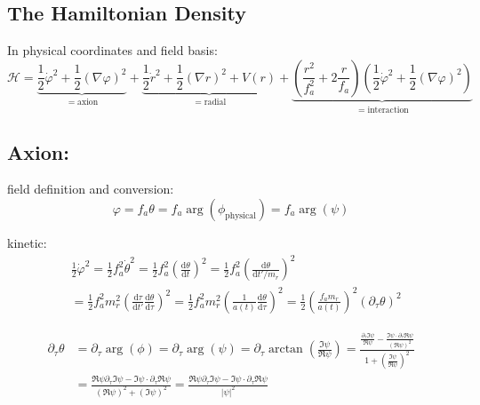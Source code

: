 \documentclass[a4paper]{article}
\begin{document}
\subsection{The Hamiltonian Density}
In physical coordinates and field basis:
\begin{equation}
    \mathcal{H} =
    \underbrace{\frac{1}{2} \dot{\varphi}^2 + \frac{1}{2} (\nabla \varphi)^2}_{= \mathrm{axion}} +
    \underbrace{\frac{1}{2} \dot{r}^2 + \frac{1}{2} (\nabla r)^2 + V(r)}_{= \mathrm{radial}} +
    \underbrace{\left( \frac{r^2}{f_a^2} + 2 \frac{r}{f_a} \right) \left( \frac{1}{2} \dot{\varphi}^2 + \frac{1}{2} (\nabla \varphi)^2 \right)}_{= \mathrm{interaction}}
\end{equation}

\subsection{Axion:}

field definition and conversion:
\begin{equation}
    \varphi = f_a \theta = f_a \arg(\phi_\mathrm{physical}) = f_a \arg(\psi)
\end{equation}

kinetic:
\begin{align}
    &\frac{1}{2} \dot{\varphi}^2 = \frac{1}{2} f_a^2 \dot{\theta}^2
    = \frac{1}{2} f_a^2 \left( \frac{\mathrm{d} \theta}{\mathrm{d} t} \right)^2
    = \frac{1}{2} f_a^2 \left( \frac{\mathrm{d} \theta}{\mathrm{d} t' / m_r} \right)^2 \\
    &= \frac{1}{2} f_a^2 m_r^2 \left( \frac{\mathrm{d} \tau}{\mathrm{d} t'} \frac{\mathrm{d} \theta}{\mathrm{d} \tau} \right)^2
    = \frac{1}{2} f_a^2 m_r^2 \left( \frac{1}{a(t)} \frac{\mathrm{d} \theta}{\mathrm{d} \tau} \right)^2
    = \frac{1}{2} \left( \frac{f_a m_r}{a(t)} \right)^2 \left( \partial_\tau \theta \right)^2
\end{align}

\begin{align}
    \partial_\tau \theta &= \partial_\tau \arg(\phi) = \partial_\tau \arg(\psi) = \partial_\tau \arctan \left( \frac{ \Im \psi }{ \Re \psi } \right)
    = \frac{ \frac{ \partial_\tau \Im \psi }{ \Re \psi } - \frac{ \Im \psi \cdot \partial_\tau \Re \psi}{(\Re \psi)^2}}{ 1 + \left( \frac{\Im \psi}{\Re \psi} \right)^2} \\
                         &= \frac{ \Re \psi \partial_\tau \Im \psi - \Im \psi \cdot \partial_\tau \Re \psi}{ (\Re \psi)^2 + (\Im \psi)^2} =  \frac{ \Re \psi \partial_\tau \Im \psi - \Im \psi \cdot \partial_\tau \Re \psi}{|\psi|^2}
\end{align}
\end{document}
